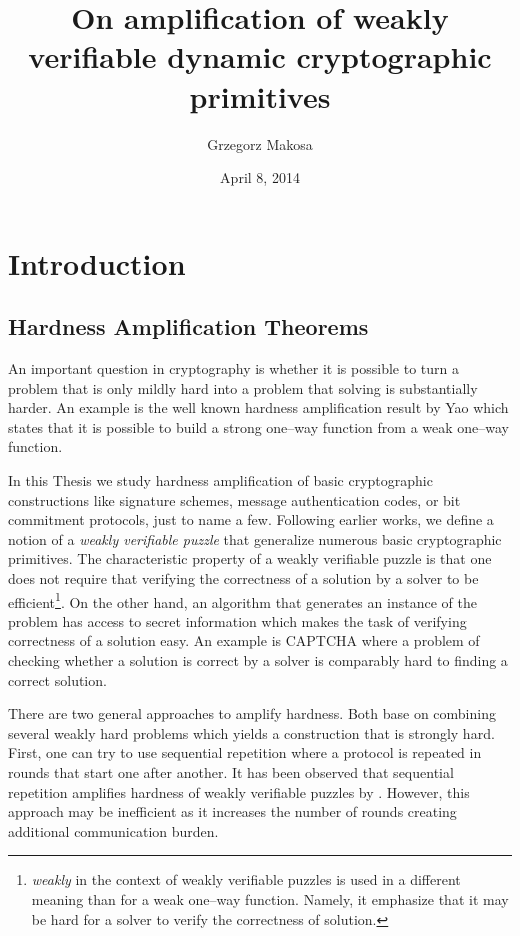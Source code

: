 \documentclass[11pt,a4paper,titlepage]{memoir}
\title{On amplification of weakly verifiable dynamic cryptographic primitives}
\author{Grzegorz Makosa}
\date{April 8, 2014}
\begin{document}
\frontmatter

%

\cleartorecto
\tableofcontents
\mainmatter

\chapter{Introduction}
\section{Hardness Amplification Theorems}
An important question in cryptography is whether it is possible to turn a problem
that is only mildly hard into a problem that solving is substantially harder.
An example is the well known hardness amplification result by Yao \cite{Goldreich:2000:FCB:519078}
which states that it is possible to build a strong one--way function from a weak one--way function.

In this Thesis we study hardness amplification of basic cryptographic constructions like signature schemes,
message authentication codes, or bit commitment protocols, just to name a few.
Following earlier works, we define a notion of a \textit{weakly verifiable puzzle} that generalize numerous basic cryptographic primitives.
The characteristic property of a weakly verifiable puzzle is that one does not require that verifying the correctness of a solution
by a solver to be efficient\footnote{\textit{weakly} in the context of weakly verifiable puzzles is used in a different meaning than for a weak one--way function.
Namely, it emphasize that it may be hard for a solver to verify the correctness of solution.}.
On the other hand, an algorithm that generates an instance of the problem has access to secret information which makes the task of verifying correctness of a solution easy.
An example is CAPTCHA where a problem of checking whether a solution is correct by a solver is comparably hard to finding a correct solution.

There are two general approaches to amplify hardness. Both base on combining several weakly hard problems which yields
a construction that is strongly hard. First, one can try to use sequential repetition where a protocol is repeated
in rounds that start one after another. It has been observed that sequential repetition amplifies hardness
of weakly verifiable puzzles by \cite{von2003captcha}. However, this approach may be inefficient as it increases
the number of rounds creating additional communication burden.
\end{document}
